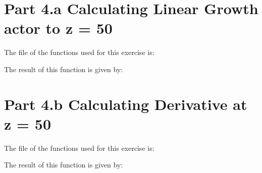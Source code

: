 \section{Part 4.a Calculating Linear Growth actor to z = 50}

The file of the functions used for this exercise is:



The result of this function is given by:




\section{Part 4.b Calculating Derivative at z = 50}

The file of the functions used for this exercise is:



The result of this function is given by:


